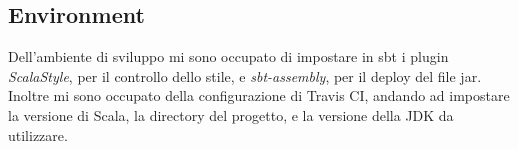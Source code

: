 \subsection{Environment}
Dell'ambiente di sviluppo mi sono occupato di impostare in sbt i plugin \textit{ScalaStyle}, per il controllo dello stile, e \textit{sbt-assembly}, per il deploy del file jar.
Inoltre mi sono occupato della configurazione di Travis CI, andando ad impostare la versione di Scala, la directory del progetto, e la versione della JDK da utilizzare.

